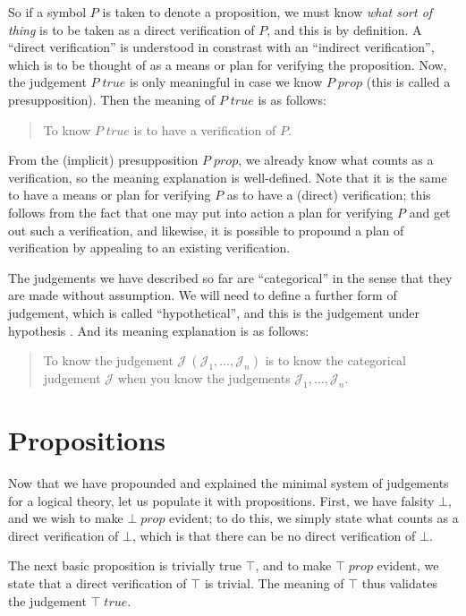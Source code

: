 \documentclass{amsart}
\theoremstyle{definition}
\theoremstyle{remark}
\numberwithin{equation}{section}
\newcommand\isprop[1]{\ensuremath{#1\;\mathit{prop}}}
\newcommand\istrue[1]{\ensuremath{#1\;\mathit{true}}}
\newcommand\hyp[2]{\ensuremath{#1\ (#2)}}
\begin{document}
So if a symbol $P$ is taken to denote a proposition, we must know \emph{what
sort of thing} is to be taken as a direct verification of $P$, and this is by
definition. A ``direct verification'' is understood in constrast with an
``indirect verification'', which is to be thought of as a means or plan for
verifying the proposition. Now, the judgement \istrue{P} is only meaningful in
case we know \isprop{P} (this is called a presupposition). Then the meaning of
\istrue{P} is as follows:
\begin{quote}
  To know \istrue{P} is to have a verification of $P$.
\end{quote}

From the (implicit) presupposition \isprop{P}, we already know what counts as a
verification, so the meaning explanation is well-defined. Note that it is the
same to have a means or plan for verifying $P$ as to have a (direct)
verification; this follows from the fact that one may put into action a plan
for verifying $P$ and get out such a verification, and likewise, it is possible
to propound a plan of verification by appealing to an existing verification.

The judgements we have described so far are ``categorical'' in the sense that
they are made without assumption. We will need to define a further form of
judgement, which is called ``hypothetical'', and this is the judgement under
hypothesis \framebox{\hyp{\mathcal{J}}{\mathcal{J}_1,\dots,\mathcal{J}_n}}. And
its meaning explanation is as follows:

\begin{quote}
  To know the judgement \hyp{\mathcal{J}}{\mathcal{J}_1,\dots,\mathcal{J}_n} is to know the
  categorical judgement $\mathcal{J}$ when you know the judgements
  $\mathcal{J}_1,\dots,\mathcal{J}_n$.
\end{quote}


\section{Propositions}
Now that we have propounded and explained the minimal system of judgements for
a logical theory, let us populate it with propositions. First, we have falsity
$\bot$, and we wish to make \isprop{\bot} evident; to do this, we simply state
what counts as a direct verification of $\bot$, which is that there can be no
direct verification of $\bot$.

The next basic proposition is trivially true $\top$, and to make \isprop{\top}
evident, we state that a direct verification of $\top$ is trivial. The meaning
of $\top$ thus validates the judgement \istrue{\top}.
\end{document}

